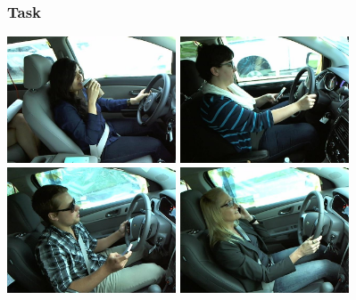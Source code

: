 \documentclass{beamer}
\begin{document}
	\begin{frame}
		\frametitle{Task}
			\begin{center}
				\includegraphics[width=5cm]{img_0} \vspace{0.1cm}
				\includegraphics[width=5cm]{img_5} \\
				\includegraphics[width=5cm]{img_6}\vspace{0.1cm}
				\includegraphics[width=5cm]{img_14}
			\end{center}
	\end{frame}
	
\end{document}
